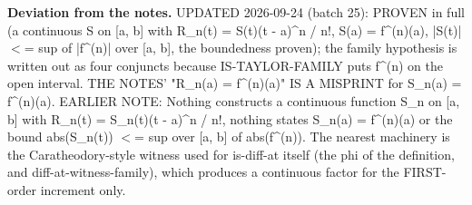 %
\noindent\textbf{Deviation from the notes.} UPDATED 2026-09-24 (batch 25): PROVEN in full (a continuous S on [a, b] with R\_n(t) = S(t)(t - a)\textasciicircum{}n / n!, S(a) = f\textasciicircum{}(n)(a), |S(t)| $<$= sup of |f\textasciicircum{}(n)| over [a, b], the boundedness proven); the family hypothesis is written out as four conjuncts because IS-TAYLOR-FAMILY puts f\textasciicircum{}(n) on the open interval. THE NOTES' "R\_n(a) = f\textasciicircum{}(n)(a)" IS A MISPRINT for S\_n(a) = f\textasciicircum{}(n)(a). EARLIER NOTE: Nothing constructs a continuous function S\_n on [a, b] with R\_n(t) = S\_n(t)(t - a)\textasciicircum{}n / n!, nothing states S\_n(a) = f\textasciicircum{}(n)(a) or the bound abs(S\_n(t)) $<$= sup over [a, b] of abs(f\textasciicircum{}(n)). The nearest machinery is the Caratheodory-style witness used for is-diff-at itself (the phi of the definition, and diff-at-witness-family), which produces a continuous factor for the FIRST-order increment only.
%
\renewcommand{\thethm}{2.22}
\begin{prop}\label{thm:taylor-exact-polynomial}
%
%
\end{prop}
%
